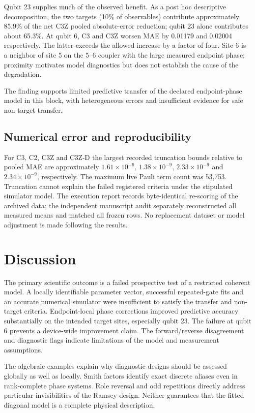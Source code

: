 \documentclass[11pt,a4paper]{article}
\begin{document}

Qubit 23 supplies much of the observed benefit. As a post hoc descriptive decomposition, the two targets (10\% of observables) contribute approximately 85.9\% of the net C3Z pooled absolute-error reduction; qubit 23 alone contributes about 65.3\%. At qubit 6, C3 and C3Z worsen MAE by 0.01179 and 0.02004 respectively. The latter exceeds the allowed increase by a factor of four. Site 6 is a neighbor of site 5 on the 5--6 coupler with the large measured endpoint phase; proximity motivates model diagnostics but does not establish the cause of the degradation.

The finding supports limited predictive transfer of the declared endpoint-phase model in this block, with heterogeneous errors and insufficient evidence for safe non-target transfer.

\subsection{Numerical error and reproducibility}

For C3, C2, C3Z and C3Z-D the largest recorded truncation bounds relative to pooled MAE are approximately $1.61\times10^{-9}$, $1.38\times10^{-9}$, $2.33\times10^{-9}$ and $2.34\times10^{-9}$, respectively. The maximum live Pauli term count was 53,753. Truncation cannot explain the failed registered criteria under the stipulated simulator model. The execution report records byte-identical re-scoring of the archived data; the independent manuscript audit separately reconstructed all measured means and matched all frozen rows. No replacement dataset or model adjustment is made following the results.

\section{Discussion}

The primary scientific outcome is a failed prospective test of a restricted coherent model. A locally identifiable parameter vector, successful repeated-gate fits and an accurate numerical simulator were insufficient to satisfy the transfer and non-target criteria. Endpoint-local phase corrections improved predictive accuracy substantially on the intended target sites, especially qubit 23. The failure at qubit 6 prevents a device-wide improvement claim. The forward/reverse disagreement and diagnostic flags indicate limitations of the model and measurement assumptions.

The algebraic examples explain why diagnostic designs should be assessed globally as well as locally. Smith factors identify exact discrete aliases even in rank-complete phase systems. Role reversal and odd repetitions directly address particular invisibilities of the Ramsey design. Neither guarantees that the fitted diagonal model is a complete physical description.
\end{document}
